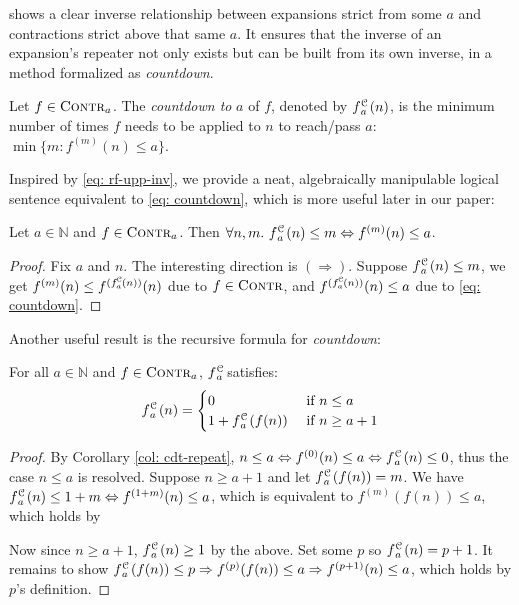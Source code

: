  shows a clear inverse relationship between expansions strict from some $a$ and contractions strict above that same $a$. It ensures that the inverse of an expansion's repeater not only exists but can be built from its own inverse, in a method formalized as \emph{countdown}.
\begin{defn} \label{defn: informal-countdown} \label{eq: countdown}
Let $f\in \text{\scshape{Contr}}_a$. The \textit{countdown to} $a$ of $f$, denoted by $\cdt{f}{a}(n)$, is the minimum number of times $f$ needs to be applied to $n$ to reach/pass $a$: 
$\min\{m: f^{(m)}(n)\le a \}$.
\end{defn}
Inspired by \eqref{eq: rf-upp-inv}, we provide a neat, algebraically manipulable logical sentence equivalent to \eqref{eq: countdown}, which is more useful later in our paper:
\begin{col} \label{col: cdt-repeat}
Let $a \in \mathbb{N}$ and $f\in \text{\scshape{Contr}}_{a}$.  Then $\forall n, m.~ \cdt{f}{a}(n)\le m \iff f^{(m)}(n)\le a$.
\end{col}
\begin{proof}
	Fix $a$ and $n$. The interesting direction is $(\Rightarrow)$. Suppose $\cdt{f}{a}(n)\le m$, we get $f^{(m)}(n)\le f^{(\cdt{f}{a}(n))}(n)$ due to $f\in \text{\scshape{Contr}}$, and $f^{(\cdt{f}{a}(n))}(n)\le a$ due to \cref{eq: countdown}.
\end{proof}
Another useful result is the recursive formula for \emph{countdown}:
\begin{thm} \label{thm: cdt-recursion}
	For all $a\in \mathbb{N}$ and $f\in \text{\scshape{Contr}}_{a}$, $\cdt{f}{a}$ satisfies:
	\begin{equation*}
	\cdt{f}{a}(n) = \begin{cases}
	0 & \text{ if } n \le a \\ 1 + \cdt{f}{a}(f(n)) & \text{ if } n \ge a + 1
	\end{cases}
	\end{equation*}
\end{thm}
\begin{proof}
By Corollary \ref{col: cdt-repeat}, $n\le a \iff f^{(0)}(n)\le a \iff \cdt{f}{a}(n)\le 0$, thus the case $n\le a$ is resolved. Suppose $n\ge a+1$ and let $\cdt{f}{a}(f(n)) = m$. We have $\cdt{f}{a}(n)\le 1+m \iff f^{(1+m)}(n) \le a$, which is equivalent to $f^{(m)}(f(n)) \le a$, which holds by 

Now since $n\ge a+1$, $\cdt{f}{a}(n)\ge 1$ by the above. Set some $p$ so 
$\cdt{f}{a}(n) = p+1$. It remains to show $\cdt{f}{a}(f(n))\le p \Rightarrow f^{(p)}(f(n))\le a \Rightarrow f^{(p+1)}(n)\le a$, which holds by $p$'s definition.
\end{proof}


